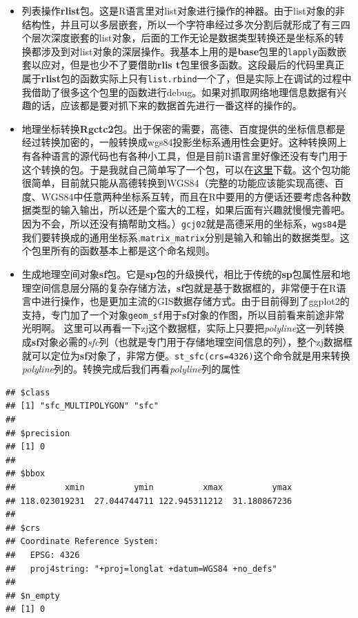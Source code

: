 \documentclass[]{article}
\begin{document}
\begin{itemize}
\item
  列表操作\textbf{rlist}包。这是R语言里对list对象进行操作的神器。由于list对象的非结构性，并且可以多层嵌套，所以一个字符串经过多次分割后就形成了有三四个层次深度嵌套的list对象，后面的工作无论是数据类型转换还是坐标系的转换都涉及到对list对象的深层操作。我基本上用的是\textbf{base}包里的\texttt{lapply}函数嵌套以应对，但是也少不了要借助\textbf{rlis
  t}包里很多函数。这段最后的代码里真正属于\textbf{rlist}包的函数实际上只有\texttt{list.rbind}一个了，但是实际上在调试的过程中我借助了很多这个包里的函数进行debug。如果对抓取网络地理信息数据有兴趣的话，应该都是要对抓下来的数据首先进行一番这样的操作的。
\item
  地理坐标转换\textbf{Rgctc2}包。出于保密的需要，高德、百度提供的坐标信息都是经过转换加密的，一般转换成wgs84投影坐标系通用性会更好。这种转换网上有各种语言的源代码也有各种小工具，但是目前R语言里好像还没有专门用于这个转换的包。于是我就自己简单写了一个包，可以在\href{https://github.com/zhouqiangnju/R_coordination_transformation}{这里}下载。这个包功能很简单，目前就只能从高德转换到WGS84（完整的功能应该能实现高德、百度、WGS84中任意两种坐标系互转，而且在R中要用的方便话还要考虑各种数据类型的输入输出，所以还是个蛮大的工程，如果后面有兴趣就慢慢完善吧。因为不会，所以还没有搞帮助文档。）\texttt{gcj02}就是高德采用的坐标系，\texttt{wgs84}是我们要转换成的通用坐标系,\texttt{matrix\_matrix}分别是输入和输出的数据类型。这个包里所有的函数基本上都是这个命名规则。
\item
  生成地理空间对象\textbf{sf}包。它是\textbf{sp}包的升级换代，相比于传统的\textbf{sp}包属性层和地理空间信息层分隔的复杂存储方法，\textbf{sf}包就是基于数据框的，非常便于在R语言中进行操作，也是更加主流的GIS数据存储方式。由于目前得到了ggplot2的支持，专门加了一个对象\texttt{geom\_sf}用于\textbf{sf}对象的作图，所以目前看来前途非常光明啊。
  这里可以再看一下zj这个数据框，实际上只要把\emph{polyline}这一列转换成\textbf{sf}对象必需的\emph{sfc}列（也就是专门用于存储地理空间信息的列），整个zj数据框就可以定位为\textbf{sf}对象了，非常方便。\texttt{st\_sfc(crs=4326)}这个命令就是用来转换\emph{polyline}列的。转换完成后我们再看\emph{polyline}列的属性
\end{itemize}

\begin{verbatim}
## $class
## [1] "sfc_MULTIPOLYGON" "sfc"             
## 
## $precision
## [1] 0
## 
## $bbox
##          xmin          ymin          xmax          ymax 
## 118.023019231  27.044744711 122.945311212  31.180867236 
## 
## $crs
## Coordinate Reference System:
##   EPSG: 4326 
##   proj4string: "+proj=longlat +datum=WGS84 +no_defs"
## 
## $n_empty
## [1] 0
\end{verbatim}
\end{document}
